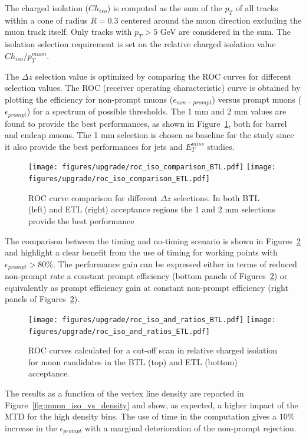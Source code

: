 The charged isolation ($Ch_{iso}$) is computed as the sum of the $p_T$ of all tracks within a cone of radius $R=0.3$ centered
around the muon direction excluding the muon track itself. Only tracks with $p_T > 5$ GeV are considered in the sum.
The isolation selection requirement is set on the relative charged isolation value $Ch_{iso}/p_T^{muon}$.

The $\Delta z$ selection value is optimized by comparing the ROC curves for different selection values.
The ROC (receiver operating characteristic) curve is obtained by plotting the efficiency for
non-prompt muons ($\epsilon_{non-prompt}$) versus prompt muons ($\epsilon_{prompt}$) for a spectrum of possible
\relChIso thresholds.
The 1 mm and 2 mm values are found to provide the best performances, as shown in Figure~\ref{fig:muon_dz_comp}, both
for barrel and endcap muons. The 1 mm selection is chosen as baseline for the study since it also provide the
best performances for jets and $E_T^{miss}$ studies.

\begin{figure}[ht!]
  \centering
  \texttt{[image: figures/upgrade/roc\_iso\_comparison\_BTL.pdf]}
  \texttt{[image: figures/upgrade/roc\_iso\_comparison\_ETL.pdf]}  \
  \caption{ROC curve comparison for different $\Delta z$ selections. In both BTL (left) and ETL (right) acceptance
    regions the 1 and 2 mm selections provide the best performance}
  \label{fig:muon_dz_comp}
\end{figure}

The comparison between the timing and no-timing scenario is shown in Figures~\ref{fig:roc_iso_ratio} and highlight
a clear benefit from the use of timing for working points with $\epsilon_{prompt}> 80\%$.
The performance gain can be expressed either in terms of reduced non-prompt rate a constant prompt efficiency
(bottom panels of Figures~\ref{fig:roc_iso_ratio}) or equivalently as prompt efficiency gain at constant non-prompt
efficiency (right panels of Figures~\ref{fig:roc_iso_ratio}).

\begin{figure}[h!]
  \centering
  \texttt{[image: figures/upgrade/roc\_iso\_and\_ratios\_BTL.pdf]}
  \texttt{[image: figures/upgrade/roc\_iso\_and\_ratios\_ETL.pdf]}
  \caption{ROC curves calculated for a cut-off scan in relative charged isolation for muon candidates
    in the BTL (top) and ETL (bottom) acceptance.}
  \label{fig:roc_iso_ratio}
\end{figure}

The results as a function of the vertex line density are reported in Figure~\ref{fig:muon_iso_vs_density} and show,
as expected, a higher impact of the MTD for the high density bins. The use of time in the \relChIso computation
gives a $10\%$ increase in the $\epsilon_{prompt}$ with a marginal deterioration of the non-prompt rejection.

